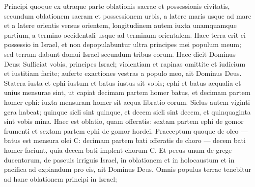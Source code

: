 \begin{biblechapter}
\begin{biblechapter}
\begin{biblechapter}
\begin{biblechapter}
\begin{biblechapter}
\begin{biblechapter}
\begin{biblechapter}
\begin{biblechapter}
\begin{biblechapter}
\begin{biblechapter}
\begin{biblechapter}
\begin{biblechapter}
\begin{biblechapter}
\begin{biblechapter}
\begin{biblechapter}
\begin{biblechapter}
\begin{biblechapter}
\begin{biblechapter}
\begin{biblechapter}
\begin{biblechapter}
\begin{biblechapter}
\begin{biblechapter}
\begin{biblechapter}
\begin{biblechapter}
\begin{biblechapter}
\begin{biblechapter}
\begin{biblechapter}
\begin{biblechapter}
\begin{biblechapter}
\begin{biblechapter}
\begin{biblechapter}
\begin{biblechapter}
\begin{biblechapter}
\begin{biblechapter}
\begin{biblechapter}
\begin{biblechapter}
\begin{biblechapter}
\begin{biblechapter}
\begin{biblechapter}
\begin{biblechapter}
\begin{biblechapter}
\begin{biblechapter}
\begin{biblechapter}
\begin{biblechapter}
\begin{biblechapter}
 \verse Principi quoque ex utraque parte oblationis sacrae et possessionis civitatis, secundum oblationem sacram et possessionem urbis, a latere maris usque ad mare et a latere orientis versus orientem, longitudinem autem iuxta unamquamque partium, a termino occidentali usque ad terminum orientalem. 
\verse Haec terra erit ei possessio in Israel, et non depopulabuntur ultra principes mei populum meum; sed terram dabunt domui Israel secundum tribus eorum.
 \verse Haec dicit Dominus Deus: Sufficiat vobis, principes Israel; violentiam et rapinas omittite et iudicium et iustitiam facite; auferte exactiones vestras a populo meo, ait Dominus Deus. 
\verse Statera iusta et ephi iustum et batus iustus sit vobis; 
\verse ephi et batus aequalia et unius mensurae sint, ut capiat decimam partem homer batus, et decimam partem homer ephi: iuxta mensuram homer sit aequa libratio eorum. 
\verse Siclus autem viginti gera habeat; quinque sicli sint quinque, et decem sicli sint decem, et quinquaginta sint vobis mina.
 \verse Haec est oblatio, quam offeratis: sextam partem ephi de gomor frumenti et sextam partem ephi de gomor hordei. 
\verse Praeceptum quoque de oleo — batus est mensura olei C: decimam partem bati offeratis de choro — decem bati homer faciunt, quia decem bati implent chorum C. 
\verse Et pecus unum de grege ducentorum, de pascuis irriguis Israel, in oblationem et in holocaustum et in pacifica ad expiandum pro eis, ait Dominus Deus. 
\verse Omnis populus terrae tenebitur ad hanc oblationem principi in Israel; 

\end{biblechapter}
\end{biblechapter}
\end{biblechapter}
\end{biblechapter}
\end{biblechapter}
\end{biblechapter}
\end{biblechapter}
\end{biblechapter}
\end{biblechapter}
\end{biblechapter}
\end{biblechapter}
\end{biblechapter}
\end{biblechapter}
\end{biblechapter}
\end{biblechapter}
\end{biblechapter}
\end{biblechapter}
\end{biblechapter}
\end{biblechapter}
\end{biblechapter}
\end{biblechapter}
\end{biblechapter}
\end{biblechapter}
\end{biblechapter}
\end{biblechapter}
\end{biblechapter}
\end{biblechapter}
\end{biblechapter}
\end{biblechapter}
\end{biblechapter}
\end{biblechapter}
\end{biblechapter}
\end{biblechapter}
\end{biblechapter}
\end{biblechapter}
\end{biblechapter}
\end{biblechapter}
\end{biblechapter}
\end{biblechapter}
\end{biblechapter}
\end{biblechapter}
\end{biblechapter}
\end{biblechapter}
\end{biblechapter}
\end{biblechapter}
